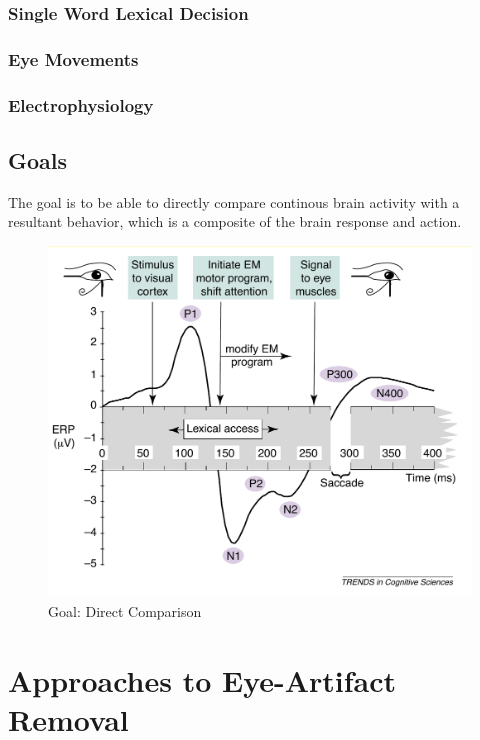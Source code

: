 \documentclass[english]{article}
\begin{document}
\subsubsection{Single Word Lexical Decision}
\subsubsection{Eye Movements}
\subsubsection{Electrophysiology}

\subsection{Goals}
The goal is to be able to directly compare continous brain activity with a
resultant behavior, which is a composite of the brain response and action.

\begin{figure}[H]
\begin{centering}
\includegraphics[scale=0.50]{review-goal}
\par\end{centering}
\caption{\label{fig:goal} Goal: Direct Comparison}
\end{figure}

\section{Approaches to Eye-Artifact Removal}
\end{document}
